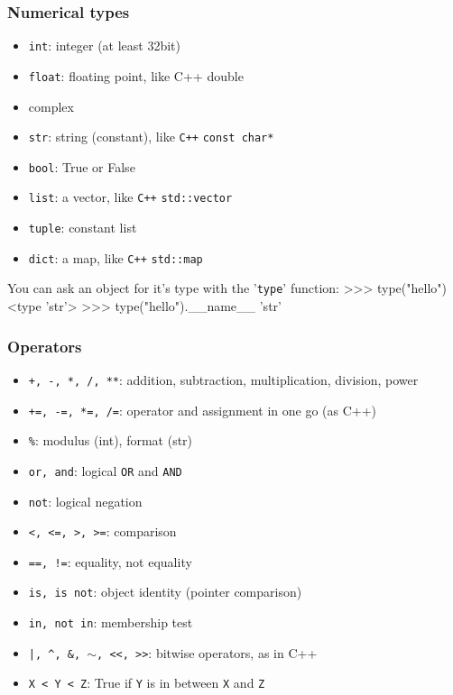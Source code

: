 \documentclass[hyperref={colorlinks=true}]{beamer}
\begin{document}

\begin{frame}[fragile]
  \frametitle{Numerical types}

  \begin{itemize}
    \item \texttt{int}: integer (at least 32bit)
    \item \texttt{float}: floating point, like C++ double
    \item complex
    \item \texttt{str}: string (constant), like \texttt{C++} \texttt{const char*}
    \item \texttt{bool}: True or False
    \item \texttt{list}: a vector, like \texttt{C++} \texttt{std::vector}
    \item \texttt{tuple}: constant list
    \item \texttt{dict}: a map, like \texttt{C++} \texttt{std::map}
  \end{itemize}
  
  \begin{ucpythonblock}{You can ask an object for it's type with the '\texttt{type}' function:}
>>> type("hello")
<type 'str'>
>>> type("hello").__name__
'str'  
  \end{ucpythonblock}
  
\end{frame}



\begin{frame}[fragile]
  \frametitle{Operators}

  \begin{itemize}
    \item \texttt{+, -, *, /, **}: addition, subtraction, multiplication, division, power 
    \item \texttt{+=, -=, *=, /=}: operator and assignment in one go (as C++)
    \item \texttt{\%}: modulus (int), format (str)
    \item \texttt{or, and}: logical \texttt{OR} and \texttt{AND}
    \item \texttt{not}: logical negation
    \item \texttt{<, <=, >, >=}: comparison
    \item \texttt{==, !=}: equality, not equality
    \item \texttt{is, is not}: object identity (pointer comparison) 
    \item \texttt{in, not in}: membership test
    \item \texttt{|, \^{}, \&, $\sim$, <<, >>}: bitwise operators, as in C++ 
    \item \texttt{X < Y < Z}: True if \texttt{Y} is in between \texttt{X} and \texttt{Z}
  \end{itemize}

\end{frame}
\end{document}
